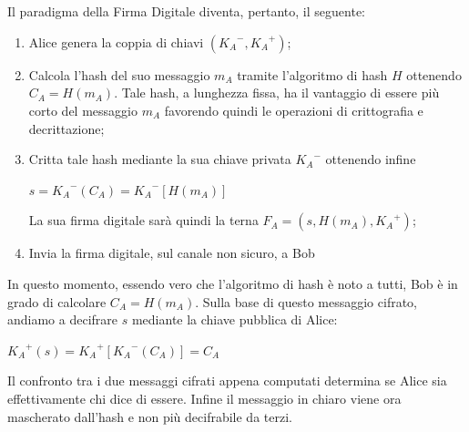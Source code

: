 \documentclass[a4paper,12pt]{tesiinfo}
\begin{document}
\\ 
\\
Il paradigma della Firma Digitale diventa, pertanto, il seguente: 
\begin{enumerate}
 \item Alice genera la coppia di chiavi $({K_A}^-, {K_A}^+)$;
 \item Calcola l'hash del suo messaggio $m_A$ tramite l'algoritmo di hash $H$ ottenendo $C_A = H(m_A)$. Tale hash, a lunghezza fissa, ha il vantaggio di essere pi\`u corto del messaggio $m_A$ favorendo quindi le operazioni di crittografia e decrittazione;
 \item Critta tale hash mediante la sua chiave privata ${K_A}^-$ ottenendo infine
 \begin{center}
  $s = {K_A}^-(C_A) = {K_A}^-[H(m_A)]$
 \end{center}
 La sua firma digitale sar\`a quindi la terna $F_A = (s, H(m_A), {K_A}^+)$;
 \item Invia la firma digitale, sul canale non sicuro, a Bob
\end{enumerate}
In questo momento, essendo vero che l'algoritmo di hash \`e noto a tutti, Bob \`e in grado di calcolare $C_A = H(m_A)$. Sulla base di questo messaggio cifrato, andiamo a decifrare $s$ mediante la chiave pubblica di Alice:
\begin{center}
 ${K_A}^+(s) = {K_A}^+[{K_A}^-(C_A)] = C_A$
\end{center}
Il confronto tra i due messaggi cifrati appena computati determina se Alice sia effettivamente chi dice di essere. Infine il messaggio in chiaro viene ora mascherato dall'hash e non pi\`u decifrabile da terzi.
%
%
%
%
%
%
%
%
%
%
\end{document}
